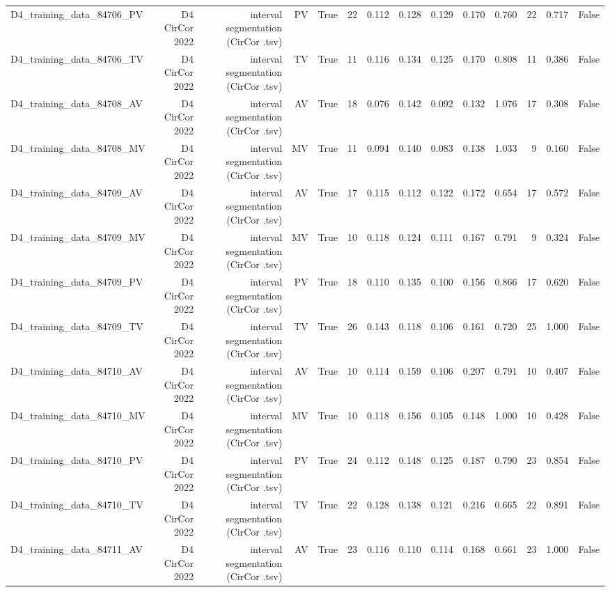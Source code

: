 \begin{table}[htbp]
\begin{tabular}{lrrrrrrrrrrrrr}
    D4\_training\_data\_84706\_PV & D4 CirCor 2022 & interval segmentation (CirCor .tsv) & PV & True & 22 & 0.112 & 0.128 & 0.129 & 0.170 & 0.760 & 22 & 0.717 & False \\
    D4\_training\_data\_84706\_TV & D4 CirCor 2022 & interval segmentation (CirCor .tsv) & TV & True & 11 & 0.116 & 0.134 & 0.125 & 0.170 & 0.808 & 11 & 0.386 & False \\
    D4\_training\_data\_84708\_AV & D4 CirCor 2022 & interval segmentation (CirCor .tsv) & AV & True & 18 & 0.076 & 0.142 & 0.092 & 0.132 & 1.076 & 17 & 0.308 & False \\
    D4\_training\_data\_84708\_MV & D4 CirCor 2022 & interval segmentation (CirCor .tsv) & MV & True & 11 & 0.094 & 0.140 & 0.083 & 0.138 & 1.033 & 9 & 0.160 & False \\
    D4\_training\_data\_84709\_AV & D4 CirCor 2022 & interval segmentation (CirCor .tsv) & AV & True & 17 & 0.115 & 0.112 & 0.122 & 0.172 & 0.654 & 17 & 0.572 & False \\
    D4\_training\_data\_84709\_MV & D4 CirCor 2022 & interval segmentation (CirCor .tsv) & MV & True & 10 & 0.118 & 0.124 & 0.111 & 0.167 & 0.791 & 9 & 0.324 & False \\
    D4\_training\_data\_84709\_PV & D4 CirCor 2022 & interval segmentation (CirCor .tsv) & PV & True & 18 & 0.110 & 0.135 & 0.100 & 0.156 & 0.866 & 17 & 0.620 & False \\
    D4\_training\_data\_84709\_TV & D4 CirCor 2022 & interval segmentation (CirCor .tsv) & TV & True & 26 & 0.143 & 0.118 & 0.106 & 0.161 & 0.720 & 25 & 1.000 & False \\
    D4\_training\_data\_84710\_AV & D4 CirCor 2022 & interval segmentation (CirCor .tsv) & AV & True & 10 & 0.114 & 0.159 & 0.106 & 0.207 & 0.791 & 10 & 0.407 & False \\
    D4\_training\_data\_84710\_MV & D4 CirCor 2022 & interval segmentation (CirCor .tsv) & MV & True & 10 & 0.118 & 0.156 & 0.105 & 0.148 & 1.000 & 10 & 0.428 & False \\
    D4\_training\_data\_84710\_PV & D4 CirCor 2022 & interval segmentation (CirCor .tsv) & PV & True & 24 & 0.112 & 0.148 & 0.125 & 0.187 & 0.790 & 23 & 0.854 & False \\
    D4\_training\_data\_84710\_TV & D4 CirCor 2022 & interval segmentation (CirCor .tsv) & TV & True & 22 & 0.128 & 0.138 & 0.121 & 0.216 & 0.665 & 22 & 0.891 & False \\
    D4\_training\_data\_84711\_AV & D4 CirCor 2022 & interval segmentation (CirCor .tsv) & AV & True & 23 & 0.116 & 0.110 & 0.114 & 0.168 & 0.661 & 23 & 1.000 & False \\

\end{tabular}
\end{table}
